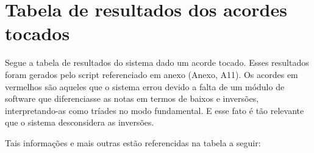 \section{Tabela de resultados dos acordes tocados}
\label{sec:tabelaacordestocados}
Segue a tabela de resultados do sistema dado um acorde tocado. Esses resultados foram gerados pelo script referenciado em anexo (Anexo, A11). Os acordes em vermelhos são aqueles que o sistema errou devido a falta de um módulo de software que diferenciasse as notas em termos de baixos e inversões, interpretando-as como tríades no modo fundamental. E esse fato é tão relevante que o sistema desconsidera as inversões.

Tais informações e mais outras estão referencidas na tabela a seguir:

\begin{table}[ht!]
 \centering
\end{table}
